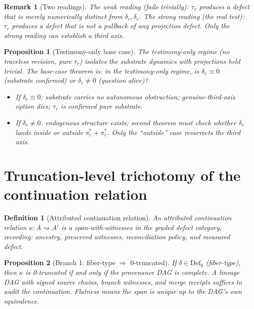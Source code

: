 \documentclass[11pt]{article}
\newtheorem{definition}{Definition}
\newtheorem{proposition}{Proposition}
\newtheorem{remark}{Remark}
\newcommand{\taur}{\tau_r}
\begin{document}
\begin{remark}[Two readings]
The weak reading (fails trivially): $\taur$ produces a defect that is merely numerically
distinct from $\delta_c, \delta_e$. The strong reading (the real test): $\taur$ produces a
defect that is not a pullback of any projection defect. Only the strong reading can establish
a third axis.
\end{remark}

\begin{proposition}[Testimony-only base case]
\label{prop:testimony-base-case}
The testimony-only regime (no traceless revision, pure $\taur$) isolates the substrate
dynamics with projections held trivial. The base-case theorem is: in the testimony-only regime,
is $\delta_r \equiv 0$ (substrate confirmed) or $\delta_r \neq 0$ (question alive)?
\begin{itemize}
  \item If $\delta_r \equiv 0$: substrate carries no autonomous obstruction; genuine-third-axis
  option dies; $\taur$ is confirmed pure substrate.
  \item If $\delta_r \neq 0$: endogenous structure exists; second theorem must check whether
  $\delta_r$ lands inside or outside $\pi_c^* + \pi_e^*$. Only the ``outside'' case resurrects
  the third axis.
\end{itemize}
\end{proposition}

\section{Truncation-level trichotomy of the continuation relation}

\begin{definition}[Attributed continuation relation]
\label{def:continuation}
An attributed continuation relation $\kappa : A \rightsquigarrow A'$ is a span-with-witnesses in
the graded defect category, recording: ancestry, preserved witnesses, reconciliation policy,
and measured defect.
\end{definition}

\begin{proposition}[Branch 1: fiber-type $\Rightarrow$ 0-truncated]
\label{prop:branch1}
If $\delta \in \mathrm{Def}_0$ (fiber-type), then $\kappa$ is 0-truncated if and only if the
provenance DAG is complete. A lineage DAG with signed source chains, branch witnesses, and
merge receipts suffices to audit the continuation. Flatness means the span is unique up to
the DAG's own equivalence.
\end{proposition}
\end{document}
